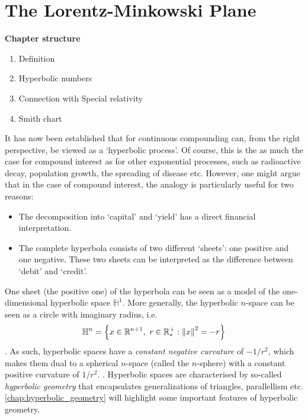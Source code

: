 \chapter{The Lorentz-Minkowski Plane}

\begin{framed}
    \textbf{Chapter structure}
    \begin{enumerate}
        \item Definition
        \item Hyperbolic numbers
        \item Connection with Special relativity
        \item Smith chart
    \end{enumerate}
\end{framed}

It has now been established that for continuous compounding can, from the right perspective, be viewed as a `hyperbolic process'. Of course, this is the as much the case for compound interest as for other exponential processes, such as radioactive decay, population growth, the spreading of disease etc. However, one might argue that in the case of compound interest, the analogy is particularly useful for two reasons:
\begin{itemize}
    \item The decomposition into `capital' and `yield' has a direct financial interpretation.
    \item The complete hyperbola consists of two different `sheets': one positive and one negative. These two sheets can be interpreted as the difference between `debit' and `credit'.
\end{itemize}
One sheet (the positive one) of the hyperbola can be seen as a model of the one-dimensional hyperbolic space $\mathbb{H}^1$. More generally, the hyperbolic $n$-space can be seen as a circle with imaginary radius, i.e. $$\mathbb{H}^n = \qty{x \in \mathbb{R}^{n+1},\ r \in \mathbb{R}^{+}_{*} : \norm{x}^2 = -r}$$. 
As such, hyperbolic spaces have a \emph{constant negative curvature} of $-1/r^2$, which makes them dual to a
spherical $n$-space (called the $n$-sphere) with a constant positive curvature of $1/r^2$. \cite{Ratcliffe2019}.
Hyperbolic spaces are characterised by so-called \emph{hyperbolic geometry} that encapsulates generalizations of triangles, parallellism etc. \cref{chap:hyperbolic_geometry} will highlight some important features of hyperbolic geometry. 

